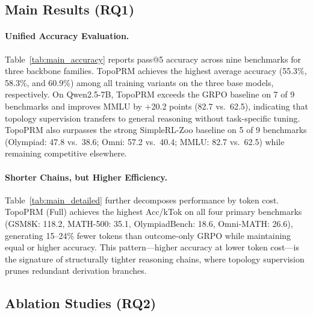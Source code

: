 


\subsection{Main Results (RQ1)}
\label{sec:rq1}

\paragraph{Unified Accuracy Evaluation.}
Table~\ref{tab:main_accuracy} reports pass@5 accuracy across nine benchmarks for three backbone families. TopoPRM achieves the highest average accuracy (55.3\%, 58.3\%, and 60.9\%) among all training variants on the three base models, respectively.
On Qwen2.5-7B, TopoPRM exceeds the GRPO baseline on 7 of 9 benchmarks and improves MMLU by $+$20.2 points (82.7 vs.\ 62.5), indicating that topology supervision transfers to general reasoning without task-specific tuning. TopoPRM also surpasses the strong SimpleRL-Zoo baseline on 5 of 9 benchmarks (Olympiad: 47.8 vs.\ 38.6; Omni: 57.2 vs.\ 40.4; MMLU: 82.7 vs.\ 62.5) while remaining competitive elsewhere.

\paragraph{Shorter Chains, but Higher Efficiency.}
Table~\ref{tab:main_detailed} further decomposes performance by token cost.
TopoPRM (Full) achieves the highest Acc/kTok on all four primary benchmarks (GSM8K: 118.2, MATH-500: 35.1, OlympiadBench: 18.6, Omni-MATH: 26.6), generating 15--24\% fewer tokens than outcome-only GRPO while maintaining equal or higher accuracy.
This pattern---higher accuracy at lower token cost---is the signature of structurally tighter reasoning chains, where topology supervision prunes redundant derivation branches.

\subsection{Ablation Studies (RQ2)}
\label{sec:rq2}

